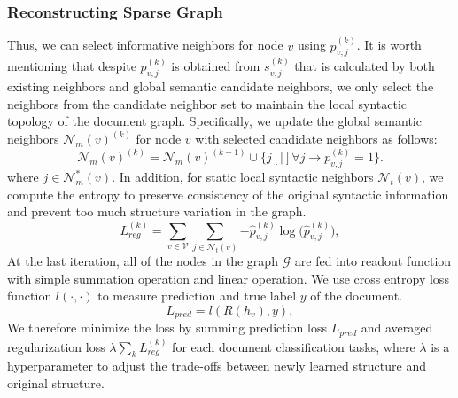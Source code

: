 \documentclass[letterpaper]{article} %
\begin{document}
\subsubsection{Reconstructing Sparse Graph}
Thus, we can select informative neighbors for node $v$ using $p_{v,j}^{(k)}$. It is worth mentioning that despite $p_{v,j}^{(k)}$ is obtained from $s_{v,j}^{(k)}$ that is calculated by both existing
neighbors and global semantic candidate neighbors, we only select the neighbors from the candidate neighbor set to maintain the local syntactic topology of the document graph. Specifically, we update the global semantic neighbors $\mathcal{N}_m(v)^{(k)}$ for node $v$ with selected candidate neighbors as follows:
\begin{equation}
\mathcal{N}_{m}(v)^{(k)}=\mathcal{N}_{m}(v)^{(k-1)}\cup{\{j\left[|\right]\forall{j\to{p}_{v,j}^{(k)}=1\}}}.
\end{equation}
where $j\in\mathcal{N}^*_m(v)$. In addition, for static local syntactic neighbors $\mathcal{N}_t(v)$, we compute the entropy to preserve consistency of the original syntactic information and prevent too much structure variation in the graph.
\begin{equation}
L_{reg}^{(k)} = \sum_{v\in\mathcal{V}}{\sum_{j\in\mathcal{N}_t(v)}{- \hat{p}_{v,j}^{(k)}\log{(\hat{p}_{v,j}^{(k)}}})},
\end{equation}
At the last iteration, all of the nodes in the graph $\mathcal{G}$ are fed into readout function with simple summation operation and linear operation. We use cross entropy loss function $l(\cdot,\cdot)$ to measure prediction and true label $y$ of the document.
\begin{equation}
L_{pred} = l(R(h_{v}), y),
\end{equation}
We therefore minimize the loss by summing prediction loss $L_{pred}$ and averaged regularization loss $\lambda\sum_{k}{L_{reg}^{(k)}}$ for each document classification tasks, where $\lambda$ is a hyperparameter to adjust the trade-offs between newly learned structure and original structure.
\end{document}
